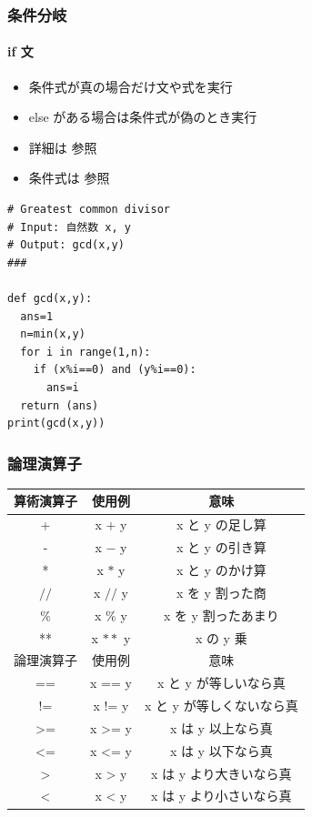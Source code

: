 \begin{frame}[fragile,label=if]
\frametitle{条件分岐}
\framesubtitle{if 文}
  \begin{itemize}
\item 条件式が真の場合だけ文や式を実行
\item else がある場合は条件式が偽のとき実行
\item 詳細は \href{https://docs.python.org/ja/3/reference/index.html}{}参照
\item 条件式は \href{https://docs.python.org/ja/3/reference/index.html}{}参照
  \end{itemize}
  \begin{lstlisting}[caption={gcd.py(if 文と for 文の例)},label=gcd]
# Greatest common divisor
# Input: 自然数 x, y
# Output: gcd(x,y)
###

def gcd(x,y):
  ans=1
  n=min(x,y)
  for i in range(1,n):
    if (x%i==0) and (y%i==0):
      ans=i
  return (ans)
print(gcd(x,y))
  \end{lstlisting}
\end{frame}
\begin{frame}[fragile]
\frametitle{論理演算子}
 \begin{center}
  \begin{tabular}{c|c|c}
算術演算子&使用例&意味\\\hline
+& x $+$ y & x と y の足し算\\
-& x $-$ y & x と y の引き算\\
*& x $*$ y & x と y のかけ算\\
$\slash\slash$& x $\slash\slash$ y & x を y 割った商\\
\%& x $\%$ y & x を y 割ったあまり\\
**& x $**$ y & x の y 乗\\\hline
論理演算子&使用例&意味\\\hline
==& x == y & x と y が等しいなら真\\
!=& x != y & x と y が等しくないなら真\\
>=& x >= y & x は y 以上なら真\\
<=& x <= y & x は y 以下なら真\\
>& x > y & x は y より大きいなら真\\
<& x < y & x は y より小さいなら真\\
  \end{tabular}
 \end{center}
\end{frame}
